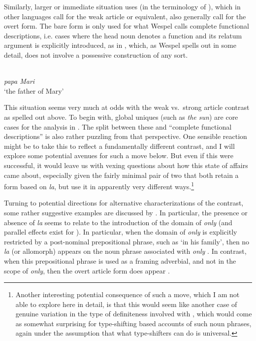 \documentclass[output=paper
,modfonts
,nonflat]{langscibook}
\begin{document}
Similarly, larger or immediate situation uses (in the
terminology of \citealt{Hawkins1978}), which in other languages call
for the weak article or equivalent, also generally call for the overt
form. The bare form is only used for what Wespel calls complete
functional descriptions, i.e. cases where the head noun denotes a
function and its relatum argument is explicitly introduced, as in
, which, as Wespel spells out in some detail, does not involve
a possessive construction of any sort.



\begin{exe}
\ex\label{ex:schwarz:25}  \citep[98]{Wespel2008}\\
\textit{papa Mari}\\
`the father of Mary' 
\end{exe}

This situation seems very much at odds with the weak vs.\ strong
article contrast as spelled out above. To begin with, global uniques
(such as \textit{the sun}) are core cases for the analysis in
\citet{Schwarz2009}. The split between these and ``complete functional
descriptions'' is also rather puzzling from that perspective. One
sensible reaction might be to take this to reflect a fundamentally
different contrast, and I will explore some potential avenues for such
a move below. But even if this were successful, it would leave us with
vexing questions about how this state of affairs came about,
especially given the fairly minimal pair of two 
that both retain a form based on  \textit{la}, but use it in
apparently very different ways.\footnote{Another interesting potential
  consequence of such a move, which I am not able to explore here in
  detail, is that this would seem like another case of genuine
  variation in the type of definiteness involved with , which would come as somewhat surprising for type-shifting
  based accounts of such noun phrases, again under the assumption that
  what type-shifters can do is universal.}

Turning to potential directions for alternative characterizations of
the  contrast, some rather suggestive examples are
discussed by \citet{Wespel2008}. In particular, the presence or
absence of \textit{la} seems to
relate to the introduction of the domain of \textit{only}
(and parallel effects exist for ). In particular, when the
domain of \textit{only} is explicitly restricted by a post-nominal
prepositional phrase, such as `in his family', then no \textit{la} (or
allomorph) appears on the noun phrase associated with \textit{only}
. In contrast, when this prepositional phrase is used as a
framing adverbial, and not in the scope of \textit{only}, then the
overt article form does appear .
\end{document}
